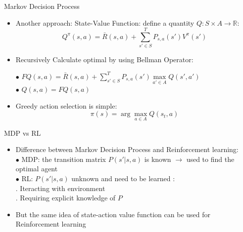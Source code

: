 \begin{frame}{Markov Decision Process}
    \begin{itemize}
        \item Another approach: State-Value Function: define a quantity $Q: S \times A\rightarrow \mathbb{R}$:\\
        \begin{equation}
        Q^\pi(s,a)=\bar{R}(s,a)+\sum_{s' \in S}^{T} P_{s,a} (s')V^\pi(s')
        \end{equation}
        \item  Recursively Calculate optimal by using Bellman Operator:
        \bigskip
        
        \hspace{0.5cm}$\bullet$ $ FQ(s,a)=\bar{R}(s,a)+\sum_{s' \in S}^{T} P_{s,a} (s') \max\limits_{a'\in A} Q (s',a') $\\
        \hspace{0.5cm}$\bullet$  $Q(s,a)=FQ(s,a)$
        \bigskip
        
        \item Greedy action selection is simple:
        \begin{equation}
        \pi(s)=\arg\max\limits_{a \in A}Q(s_{t},a)
        \end{equation}
    \end{itemize}
\end{frame}


\begin{frame}{MDP vs RL}
    \begin{itemize}
        \item Difference between Markov Decision Process and Reinforcement learning:\\
        \bigskip
        \hspace{0.5cm}$\bullet$  MDP: the transition matrix $P(s'|s,a)$ is known $\rightarrow$ used to find the optimal agent\\
        \hspace{0.5cm}$\bullet$  RL: $P(s'|s,a)$ unknown and need to be learned :\\
        \hspace{1cm} . Iteracting with environment \\
        \hspace{1cm} . Requiring explicit knowledge of $P$
        \bigskip
        \item But the same idea of state-action value function can be used for Reinforcement learning
        
    \end{itemize}
\end{frame}

